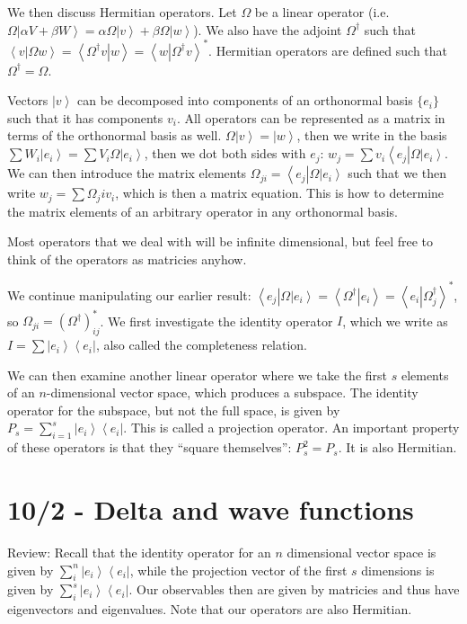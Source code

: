 \documentclass[10pt]{report}
\newcommand{\bra}[1]{\left<#1\right|}
\newcommand{\ket}[1]{\left|#1\right>}
\newcommand{\dotp}[2]{\left<#1\left.\right|#2\right>}
\begin{document}
We then discuss Hermitian operators. Let $\Omega$ be a linear operator (i.e. $\Omega\ket{\alpha V + \beta W} = \alpha\Omega \ket{v} + \beta\Omega\ket{w}$). We also have the adjoint $\Omega^\dagger$ such that $\dotp{v}{\Omega w} = \dotp{\Omega^\dagger v}{w} = \dotp{w}{\Omega^\dagger v}^*$. Hermitian operators are defined such that $\Omega^\dagger = \Omega$. 

Vectors $\ket{v}$ can be decomposed into components of an orthonormal basis $\{e_i\}$ such that it has components $v_i$. All operators can be represented as a matrix in terms of the orthonormal basis as well. $\Omega\ket{v}=\ket{w}$, then we write in the basis $\sum{W_i\ket{e_i}} = \sum{V_i\Omega\ket{e_i}}$, then we dot both sides with $e_j$: $w_j=\sum{v_i\bra{e_j}\Omega\ket{e_i}}$. We can then introduce the matrix elements $\Omega_{ji}=\bra{e_j}\Omega\ket{e_i}$ such that we then write $w_j=\sum{\Omega_ji}v_i$, which is then a matrix equation. This is how to determine the matrix elements of an arbitrary operator in any orthonormal basis.

Most operators that we deal with will be infinite dimensional, but feel free to think of the operators as matricies anyhow. 

We continue manipulating our earlier result: $\bra{e_j}\Omega\ket{e_i} = \dotp{\Omega^\dagger}{e_i} = \dotp{e_i}{\Omega^{\dagger}_j}^*$, so $\Omega_{ji}=(\Omega^{\dagger})^*_{ij}$. We first investigate the identity operator $I$, which we write as $I=\sum{\ket{e_i}\bra{e_i}}$, also called the completeness relation.

We can then examine another linear operator where we take the first $s$ elements of an $n$-dimensional vector space, which produces a subspace. The identity operator for the subspace, but not the full space, is given by $P_s=\sum_{i=1}^{s}{\ket{e_i}\bra{e_i}}$. This is called a projection operator. An important property of these operators is that they ``square themselves'': $P_s^2 = P_s$. It is also Hermitian. 

\chapter{10/2 - Delta and wave functions}

Review: Recall that the identity operator for an $n$ dimensional vector space is given by $\sum_i^n \ket{e_i}\bra{e_i}$, while the projection vector of the first $s$ dimensions is given by $\sum_i^s \ket{e_i}\bra{e_i}$. Our observables then are given by matricies and thus have eigenvectors and eigenvalues. Note that our operators are also Hermitian.
\end{document}
